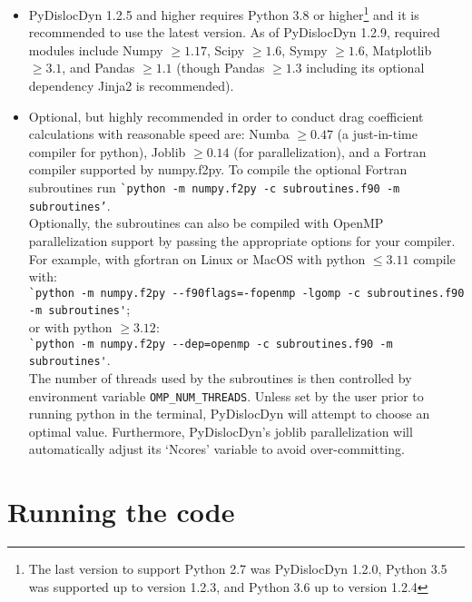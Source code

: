 \documentclass[11pt,letterpaper,oneside,pdftex]{article}
\begin{document}
\begin{itemize}
\item PyDislocDyn 1.2.5 and higher requires Python 3.8 or higher\footnote{
The last version to support Python 2.7 was PyDislocDyn 1.2.0, Python 3.5 was supported up to version 1.2.3, and Python 3.6 up to version 1.2.4}
and it is recommended to use the latest version.
As of PyDislocDyn 1.2.9, required modules include Numpy $\ge1.17$, Scipy $\ge1.6$, Sympy $\ge1.6$, Matplotlib $\ge3.1$, and Pandas $\ge1.1$ (though Pandas $\ge1.3$ including its optional dependency Jinja2 is recommended).
\item Optional, but highly recommended in order to conduct drag coefficient calculations with reasonable speed are:
Numba $\ge0.47$ (a just-in-time compiler for python), Joblib $\ge0.14$ (for parallelization), and a Fortran compiler supported by numpy.f2py. To compile the optional Fortran subroutines run \verb|`python -m numpy.f2py -c subroutines.f90 -m subroutines’|.\\
Optionally, the subroutines can also be compiled with OpenMP parallelization support by passing the appropriate options for your compiler. For example, with gfortran on Linux or MacOS with python $\leq3.11$ compile with:
\\\verb|`python -m numpy.f2py --f90flags=-fopenmp -lgomp -c subroutines.f90|\\\verb|-m subroutines'|;\\
or with python $\geq3.12$:
\\\verb|`python -m numpy.f2py --dep=openmp -c subroutines.f90 -m subroutines'|.\\
The number of threads used by the subroutines is then controlled by environment variable \verb|OMP_NUM_THREADS|.
Unless set by the user prior to running python in the terminal, PyDislocDyn will attempt to choose an optimal value.
Furthermore, PyDislocDyn’s joblib parallelization will automatically adjust its ‘Ncores’ variable to avoid over-committing.
\end{itemize}


\section{Running the code}
\end{document}
